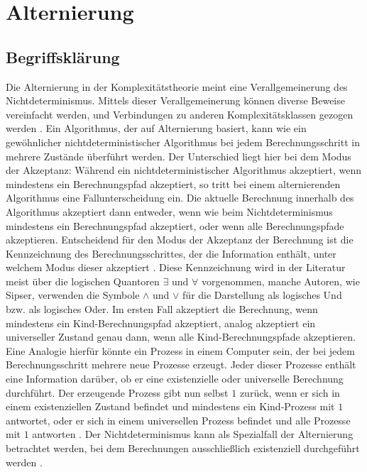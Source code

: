 \chapter{Alternierung} \label{chapter: Alternierung}

\section{Begriffsklärung} \label{section: Begriffsklärung}
Die Alternierung in der Komplexitätstheorie meint eine Verallgemeinerung des Nichtdeterminismus. Mittels dieser Verallgemeinerung 
können diverse Beweise vereinfacht werden, und Verbindungen zu anderen Komplexitätsklassen gezogen werden \cite{sipser_introduction_2012} \cite{chandra_alternation_1976}. Ein Algorithmus, der auf Alternierung basiert,
kann wie ein gewöhnlicher nichtdeterministischer Algorithmus bei jedem Berechnungsschritt in mehrere Zustände überführt werden. Der Unterschied liegt hier bei dem Modus der Akzeptanz:
Während ein nichtdeterministischer Algorithmus akzeptiert, wenn mindestens ein Berechnungspfad akzeptiert, so tritt bei einem alternierenden Algorithmus eine Fallunterscheidung ein.
Die aktuelle Berechnung innerhalb des Algorithmus akzeptiert dann entweder, wenn wie beim Nichtdeterminismus mindestens ein Berechnungspfad akzeptiert, oder wenn alle Berechnungspfade akzeptieren.
Entscheidend für den Modus der Akzeptanz der Berechnung ist die Kennzeichnung des Berechnungsschrittes, der die Information enthält, unter welchem Modus dieser akzeptiert \cite{sipser_introduction_2012}.
Diese Kennzeichnung wird in der Literatur meist über die logischen Quantoren $\exists$ und $\forall$ vorgenommen, manche Autoren, wie Sipser, verwenden die Symbole $\land$ und $\lor$ für die Darstellung als logisches Und bzw. als logisches Oder.
Im ersten Fall akzeptiert die Berechnung, wenn mindestens ein Kind-Berechnungspfad akzeptiert, analog akzeptiert ein universeller Zustand genau dann, wenn alle Kind-Berechnungspfade akzeptieren.
Eine Analogie hierfür könnte ein Prozess in einem Computer sein, der bei jedem Berechnungsschritt mehrere neue Prozesse erzeugt.
Jeder dieser Prozesse enthält eine Information darüber, ob er eine existenzielle oder universelle Berechnung durchführt. Der erzeugende Prozess gibt nun selbst $1$ zurück, wenn er sich in einem existenziellen Zustand befindet
und mindestens ein Kind-Prozess mit $1$ antwortet, oder er sich in einem universellen Prozess befindet und alle Prozesse mit $1$ antworten \cite{sipser_introduction_2012}.
Der Nichtdeterminismus kann als Spezialfall der Alternierung betrachtet werden, bei dem Berechnungen ausschließlich existenziell durchgeführt werden \cite{chandra_alternation_1976}.

